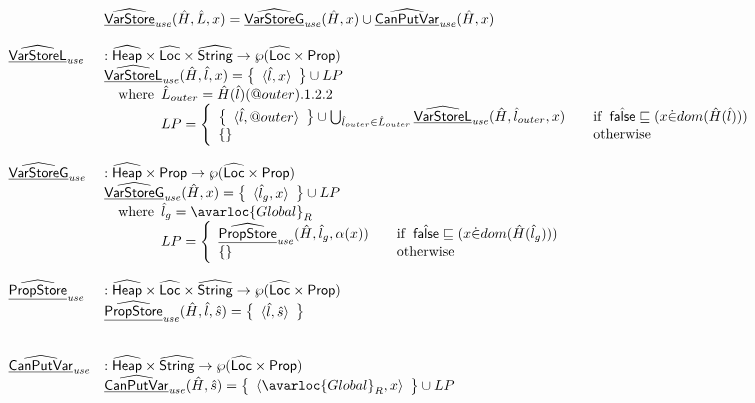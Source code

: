 \[\begin{array}{ll}
& \ahf{VarStore}_{\it use}(\hat{H}, \hat{L}, x)
= \ahf{VarStoreG}_{\it use}(\hat{H}, x) \cup \ahf{CanPutVar}_{\it use}(\hat{H},x)
\\\\
\ahf{VarStoreL}_{\it use} & : \aHeap \times \aLoc \times \abs{String} \rightarrow \powerset{\aLoc \times \SF{Prop}}\\
& \ahf{VarStoreL}_{\it use}(\hat{H}, \hat{l}, x) = \set{\langle\hat{l},x\rangle} \cup LP\\
&\quad\wherec{
  \hat{L}_{outer} = \hat{H}(\hat{l})(\varprop{outer}).1.2.2\\
  LP=\left\{
    \begin{array}{ll}
      \set{\langle \hat{l},\varprop{outer}\rangle} \cup \bigcup_{\hat{l}_{outer}\in\hat{L}_{outer}}\ahf{VarStoreL}_{\it use}(\hat{H},\hat{l}_{outer},x) 
        & \quad\ifc{\afalse\sqsubseteq (x\dot{\in}dom(\hat{H}(\hat{l})))} \\
      \set{}&\quad\owc
    \end{array}
  \right.\\
}
\\\\
\ahf{VarStoreG}_{\it use} & : \aHeap \times \SF{Prop} \rightarrow \powerset{\aLoc \times \SF{Prop}}\\
& \ahf{VarStoreG}_{\it use}(\hat{H},x) = \set{\langle \hat{l}_g, x\rangle} \cup LP\\
& \quad\wherec{
  \hat{l}_g = \avarloc{Global}_R\\
  LP = \left\{
    \begin{array}{ll}
      \ahf{PropStore}_{\it use}(\hat{H},\hat{l}_g,\alpha(x)) & \quad\ifc{\afalse\sqsubseteq(x \dot{\in} dom(\hat{H}(\hat{l}_g)))} \\
      \set{} & \quad\owc
    \end{array}
  \right.
}
\\\\
\ahf{PropStore}_{\it use} & : \aHeap \times \aLoc \times \abs{String} \rightarrow \powerset{\aLoc \times \SF{Prop}}\\
& \ahf{PropStore}_{\it use}(\hat{H},\hat{l},\hat{s}) = \set{\langle \hat{l},\hat{s}\rangle}\\
\\\\
\ahf{CanPutVar}_{\it use} & : \aHeap \times \abs{String} \rightarrow \powerset{\aLoc \times \SF{Prop}}\\
& \ahf{CanPutVar}_{\it use}(\hat{H},\hat{s})
= \set{\langle \avarloc{Global}_R,x\rangle}\cup LP\\

\end{array}\]

